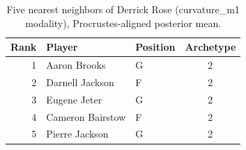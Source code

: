 \begin{table}[htbp]
  \centering\small
  \begin{tabular}{rllc}
    \toprule
    Rank & Player & Position & Archetype \\
    \midrule
    1 & Aaron Brooks & G & 2 \\
    2 & Darnell Jackson & F & 2 \\
    3 & Eugene Jeter & G & 2 \\
    4 & Cameron Bairstow & F & 2 \\
    5 & Pierre Jackson & G & 2 \\
    \bottomrule
  \end{tabular}
  \caption{Five nearest neighbors of Derrick Rose (curvature_m1 modality), Procrustes-aligned posterior mean.}
  \label{tab:Derrick_Rose_neighbors_curvature_m1}
\end{table}

